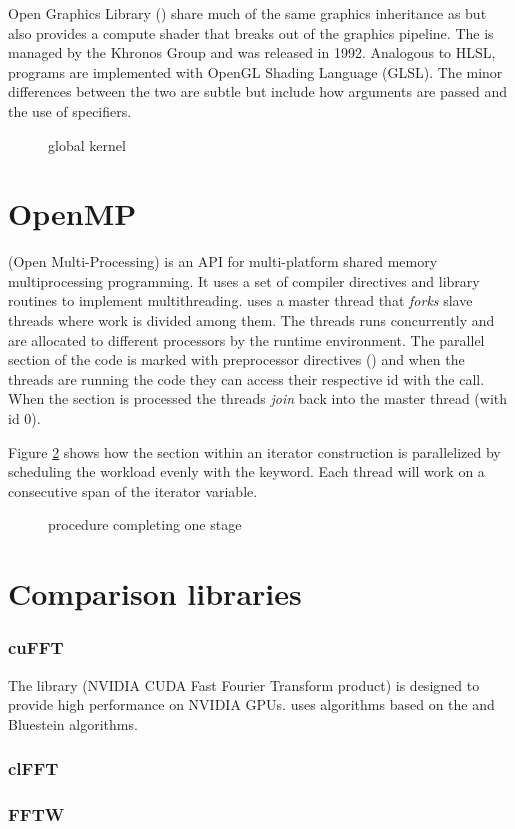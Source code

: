 Open Graphics Library ({\GL}) share much of the same graphics inheritance as {\DX} but also provides a compute shader that breaks out of the graphics pipeline. The {\GL} is managed by the Khronos Group and was released in 1992. Analogous to HLSL, {\GL} programs are implemented with OpenGL Shading Language (GLSL). The minor differences between the two are subtle but include how arguments are passed and the use of specifiers.

\begin{figure}
	\centering
	\fbox{}
	\caption{{\GL} global kernel}
	\label{lst:sample:global:gl}	
\end{figure}

\section{OpenMP}

{\OMP} (Open Multi-Processing) is an API for multi-platform shared memory multiprocessing programming. It uses a set of compiler directives and library routines to implement multithreading. {\OCL} uses a master thread that \emph{forks} slave threads where work is divided among them. The threads runs concurrently and are allocated to different processors by the runtime environment. The parallel section of the code is marked with preprocessor directives () and when the threads are running the code they can access their respective id with the  call. When the section is processed the threads \emph{join} back into the master thread (with id $0$).

Figure \ref{lst:sample:global:omp} shows how the section within an iterator construction is parallelized by scheduling the workload evenly with the  keyword. Each thread will work on a consecutive span of the iterator variable. 

\begin{figure}
	\centering
	\fbox{}%
	\caption{{\OMP} procedure completing one stage}%
	\label{lst:sample:global:omp}%
\end{figure}%

\section{Comparison libraries}

\subsubsection{cuFFT}

The library {\CUFFT} (NVIDIA CUDA Fast Fourier Transform product)\cite{Nvidia2013} is designed to provide high performance on NVIDIA GPUs. {\CUFFT} uses algorithms based on the {\CTALG} and Bluestein algorithms\cite{Bluestein1970}.

\subsubsection{clFFT}

\subsubsection{FFTW}